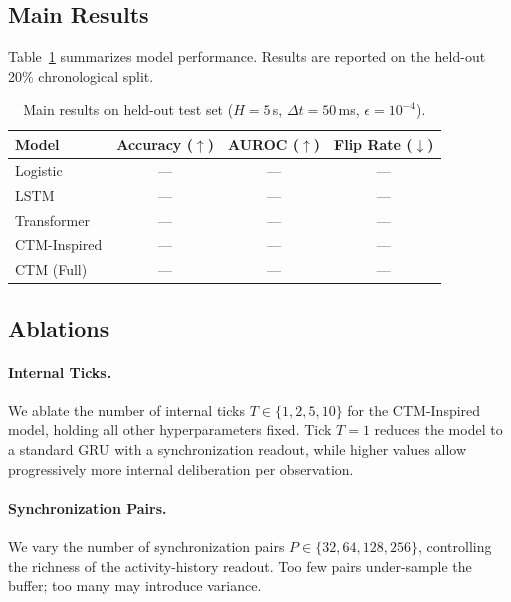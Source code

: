 \documentclass[11pt]{article}
\begin{document}
\subsection{Main Results}

Table~\ref{tab:main_results} summarizes model performance. Results are
reported on the held-out 20\% chronological split.

\begin{table}[h]
\centering
\caption{Main results on held-out test set ($H = 5$\,s, $\Delta t = 50$\,ms,
         $\epsilon = 10^{-4}$).}
\label{tab:main_results}
\begin{tabular}{lccc}
  \toprule
  Model              & Accuracy ($\uparrow$) & AUROC ($\uparrow$) & Flip Rate ($\downarrow$) \\
  \midrule
  Logistic           & ---                   & ---                & ---                      \\
  LSTM               & ---                   & ---                & ---                      \\
  Transformer        & ---                   & ---                & ---                      \\
  CTM-Inspired       & ---                   & ---                & ---                      \\
  CTM (Full)         & ---                   & ---                & ---                      \\
  \bottomrule
\end{tabular}
\end{table}

\subsection{Ablations}

\paragraph{Internal Ticks.}
We ablate the number of internal ticks $T \in \{1, 2, 5, 10\}$ for the
CTM-Inspired model, holding all other hyperparameters fixed. Tick $T = 1$
reduces the model to a standard GRU with a synchronization readout, while
higher values allow progressively more internal deliberation per observation.

\paragraph{Synchronization Pairs.}
We vary the number of synchronization pairs $P \in \{32, 64, 128, 256\}$,
controlling the richness of the activity-history readout. Too few pairs
under-sample the buffer; too many may introduce variance.
\end{document}
